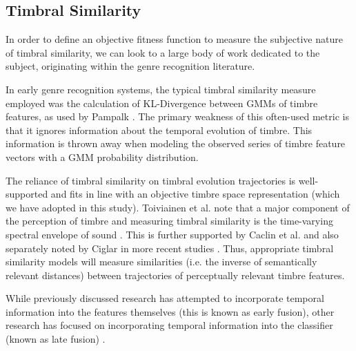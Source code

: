 \documentclass[12pt]{report} 	%
\numberwithin{figure}{chapter}
\numberwithin{table}{chapter}
\numberwithin{equation}{chapter}
\begin{document}
\begin{flushleft}
\vspace{12pt}
\subsection{Timbral Similarity}

In order to define an objective fitness function to measure the subjective nature of timbral similarity, we can look to a large body of work dedicated to the subject, originating within the genre recognition literature.

In early genre recognition systems, the typical timbral similarity measure employed was the calculation of KL-Divergence between GMMs of timbre features, as used by Pampalk \cite{Pampalk:2006pr}. The primary weakness of this often-used metric is that it ignores information about the temporal evolution of timbre. This information is thrown away when modeling the observed series of timbre feature vectors with a GMM probability distribution. 

The reliance of timbral similarity on timbral evolution trajectories is well-supported and fits in line with an objective timbre space representation (which we have adopted in this study). Toiviainen et al. note that a major component of the perception of timbre and measuring timbral similarity is the time-varying spectral envelope of sound \cite[p.225]{Toiviainen:1998hs}. This is further supported by Caclin et al. and also separately noted by Ciglar in more recent studies \cite[p. 1]{Caclin:2005il} \cite[p. 4]{Ciglar:2009uf}. Thus, appropriate timbral similarity models will measure similarities (i.e. the inverse of semantically relevant distances) between trajectories of perceptually relevant timbre features. 

While previously discussed research has attempted to incorporate temporal information into the features themselves (this is known as early fusion), other research has focused on incorporating temporal information into the classifier (known as late fusion) \cite[p. 500]{Meng:2005fx}.


\end{flushleft}
\end{document}
